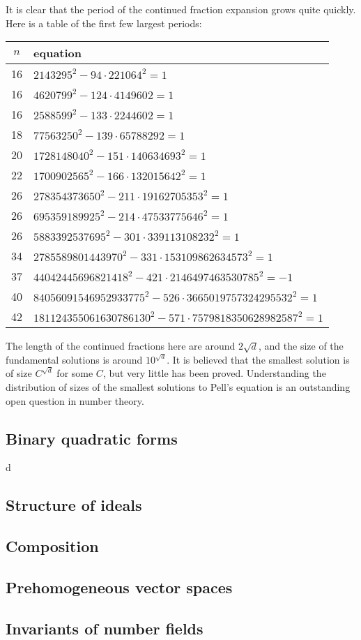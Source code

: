 It is clear that the period of the continued fraction expansion grows quite 
quickly. Here is a table of the first few largest periods:
\begin{center}
\begin{tabular}{c|l}
$n$ & equation \\ \hline
16 & $2143295^2 - 94\cdot 221064^2 = 1$ \\
16 & $4620799^2 - 124\cdot 414960 2 = 1$ \\
16 & $2588599^2 - 133\cdot 224460 2 = 1$ \\
18 & $77563250^2 - 139\cdot 6578829 2 = 1$ \\
20 & $1728148040^2 - 151\cdot 140634693^2 = 1$ \\
22 & $1700902565^2 - 166\cdot 132015642^2 = 1$ \\
26 & $278354373650^2 - 211\cdot 19162705353^2 = 1$ \\
26 & $695359189925^2 - 214\cdot 47533775646^2 = 1$ \\
26 & $5883392537695^2 - 301\cdot 339113108232^2 = 1$ \\
34 & $2785589801443970^2 - 331\cdot 153109862634573^2 = 1$ \\
37 & $44042445696821418^2 - 421\cdot 2146497463530785^2 = -1$ \\
40 & $84056091546952933775^2 - 526\cdot 3665019757324295532^2 = 1$ \\
42 & $181124355061630786130^2 - 571\cdot 7579818350628982587^2 = 1$
\end{tabular}
\end{center}
The length of the continued fractions here are around $2\sqrt d$, and the 
size of the fundamental solutions is around $10^{\sqrt d}$. It is believed that 
the smallest solution is of size $C^{\sqrt d}$ for some $C$, but very little 
has been proved. Understanding the distribution of sizes of the smallest 
solutions to Pell's equation is an outstanding open question in number theory. 





\subsection{Binary quadratic forms}

d

\subsection{Structure of ideals}

\subsection{Composition}

\subsection{Prehomogeneous vector spaces}

\subsection{Invariants of number fields}


